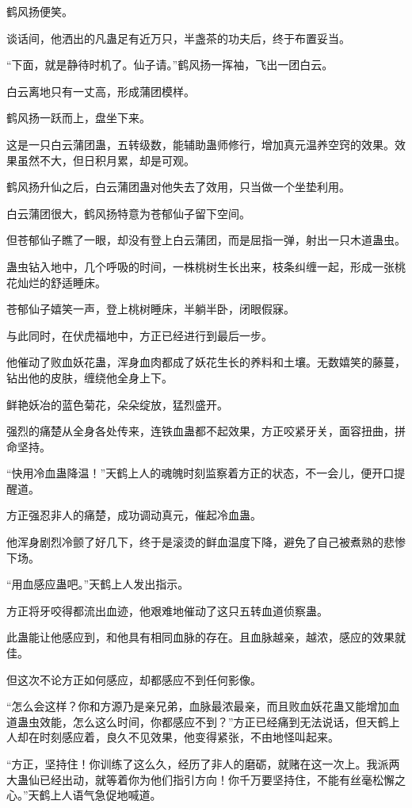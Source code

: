 \begin{this_body}
鹤风扬便笑。

谈话间，他洒出的凡蛊足有近万只，半盏茶的功夫后，终于布置妥当。

“下面，就是静待时机了。仙子请。”鹤风扬一挥袖，飞出一团白云。

白云离地只有一丈高，形成蒲团模样。

鹤风扬一跃而上，盘坐下来。

这是一只白云蒲团蛊，五转级数，能辅助蛊师修行，增加真元温养空窍的效果。效果虽然不大，但日积月累，却是可观。

鹤风扬升仙之后，白云蒲团蛊对他失去了效用，只当做一个坐垫利用。

白云蒲团很大，鹤风扬特意为苍郁仙子留下空间。

但苍郁仙子瞧了一眼，却没有登上白云蒲团，而是屈指一弹，射出一只木道蛊虫。

蛊虫钻入地中，几个呼吸的时间，一株桃树生长出来，枝条纠缠一起，形成一张桃花灿烂的舒适睡床。

苍郁仙子嬉笑一声，登上桃树睡床，半躺半卧，闭眼假寐。

与此同时，在伏虎福地中，方正已经进行到最后一步。

他催动了败血妖花蛊，浑身血肉都成了妖花生长的养料和土壤。无数嬉笑的藤蔓，钻出他的皮肤，缠绕他全身上下。

鲜艳妖冶的蓝色菊花，朵朵绽放，猛烈盛开。

强烈的痛楚从全身各处传来，连铁血蛊都不起效果，方正咬紧牙关，面容扭曲，拼命坚持。

“快用冷血蛊降温！”天鹤上人的魂魄时刻监察着方正的状态，不一会儿，便开口提醒道。

方正强忍非人的痛楚，成功调动真元，催起冷血蛊。

他浑身剧烈冷颤了好几下，终于是滚烫的鲜血温度下降，避免了自己被煮熟的悲惨下场。

“用血感应蛊吧。”天鹤上人发出指示。

方正将牙咬得都流出血迹，他艰难地催动了这只五转血道侦察蛊。

此蛊能让他感应到，和他具有相同血脉的存在。且血脉越亲，越浓，感应的效果就佳。

但这次不论方正如何感应，却都感应不到任何影像。

“怎么会这样？你和方源乃是亲兄弟，血脉最浓最亲，而且败血妖花蛊又能增加血道蛊虫效能，怎么这么时间，你都感应不到？”方正已经痛到无法说话，但天鹤上人却在时刻感应着，良久不见效果，他变得紧张，不由地怪叫起来。

“方正，坚持住！你训练了这么久，经历了非人的磨砺，就赌在这一次上。我派两大蛊仙已经出动，就等着你为他们指引方向！你千万要坚持住，不能有丝毫松懈之心。”天鹤上人语气急促地喊道。


\end{this_body}
